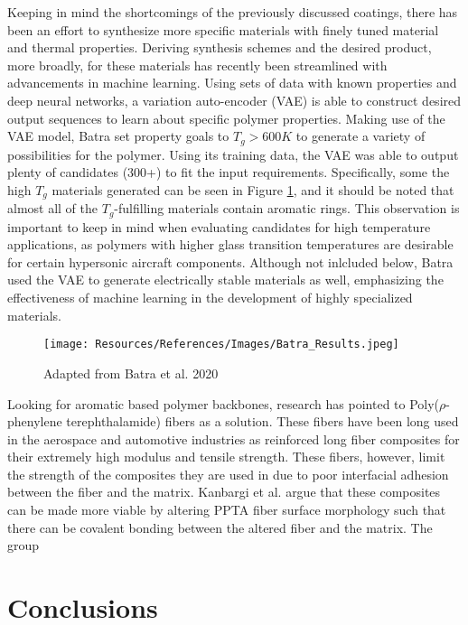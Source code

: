 \documentclass[12pt, twocolumn]{article}
\begin{document}
\indent Keeping in mind the shortcomings of the previously discussed coatings, there has been an effort to synthesize more specific materials with finely tuned material and thermal properties. Deriving synthesis schemes and the desired product, more broadly, for these materials has recently been streamlined with advancements in machine learning. Using sets of data with known properties and deep neural networks, a variation auto-encoder (VAE) is able to construct desired output sequences to learn about specific polymer properties. \citep{Batra2020} Making use of the VAE model, Batra set property goals to $T_g>600K$ to generate a variety of possibilities for the polymer. Using its training data, the VAE was able to output plenty of candidates (300+) to fit the input requirements. Specifically, some the high $T_g$ materials generated can be seen in Figure \ref{fig:Batra_Results}, and it should be noted that almost all of the $T_g$-fulfilling materials contain aromatic rings. This observation is important to keep in mind when evaluating candidates for high temperature applications, as polymers with higher glass transition temperatures are desirable for certain hypersonic aircraft components. Although not inlcluded below, Batra used the VAE to generate electrically stable materials as well, emphasizing the effectiveness of machine learning in the development of highly specialized materials.

\begin{figure}[h]
    \centering
    \texttt{[image: Resources/References/Images/Batra\_Results.jpeg]}
    \caption{\scriptsize{Adapted from Batra et al. 2020 \citep{Batra2020}}}
    \label{fig:Batra_Results}
\end{figure}

\indent Looking for aromatic based polymer backbones, research has pointed to Poly($\rho$-phenylene terephthalamide) fibers as a solution. These fibers have been long used in the aerospace and automotive industries as reinforced long fiber composites for their extremely high modulus and tensile strength. These fibers, however, limit the strength of the composites they are used in due to poor interfacial adhesion between the fiber and the matrix. \citep{Kanbargi2017} Kanbargi et al. argue that these composites can be made more viable by altering PPTA fiber surface morphology such that there can be covalent bonding between the altered fiber and the matrix. The group 

\section{Conclusions}
\end{document}
